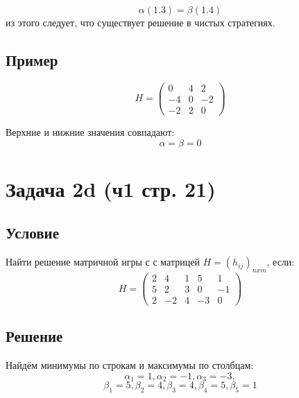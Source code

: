 \documentclass[a4paper,14pt]{extreport}
\begin{document}
\begin{equation}
    \alpha (1.3) = \beta (1.4)
\end{equation}
из этого следует, что существует решение в чистых стратегиях.

\subsection{Пример}
\begin{equation*}
    H = \begin{pmatrix} 
            0 & 4 & 2 \\
            -4 & 0 & -2 \\
            -2 & 2 & 0
        \end{pmatrix}
\end{equation*}

Верхние и нижние значения совпадают:
\begin{equation}
    \alpha = \beta = 0
\end{equation}

\section{Задача 2d (ч1 стр. 21)}
\subsection{Условие}

Найти решение матричной игры с с матрицей $H=(h_{ij})_{nxm}$, если: 
\begin{equation*}
    H = \begin{pmatrix} 
            2 & 4 & 1 & 5 & 1 \\ 
            5 & 2 & 3 & 0 & -1 \\
            2 & -2 & 4 & -3 & 0
        \end{pmatrix}
\end{equation*}

\subsection{Решение}
Найдём минимумы по строкам и максимумы по столбцам:
\begin{equation}
    \alpha_1 = 1, 
    \alpha_2 = -1,
    \alpha_3 = -3, 
\end{equation}
\begin{equation}
    \beta_1 = 5,
    \beta_2 = 4,
    \beta_3 = 4,
    \beta_4 = 5,
    \beta_5 = 1
\end{equation}
\end{document}
